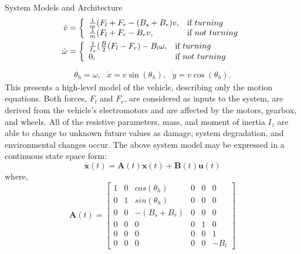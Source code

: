 \begin{section}{System Models and Architecture}
	\begin{equation}
    \begin{split}
    \label{eqn:plant}
    \dot{v}&=\left\{
    \begin{array}{ll}
    \frac{1}{m}(F_l+F_r-(B_s+B_r)v, & \hbox{if } turning\\
    \frac{1}{m}(F_l+F_r-B_rv, & \hbox{if } not~turning
    \end{array}
    \right.\\
    \dot{\omega}&=\left\{
    \begin{array}{ll}
    \frac{1}{I_z}(\frac{B}{2}(F_l-F_r)-B_l\omega, & \hbox{if } turning\\
    0, & \hbox{if } not~turning
    \end{array}
    \right.\\
    \end{split}
    \end{equation}
    \begin{align}
     \dot{\theta_h}=\omega,\text{ } \dot{x}=v\sin(\theta_h),\text{ } \dot{y}=v\cos(\theta_h).
	\end{align}
This presents a high-level model of the vehicle, describing only the motion equations. Both forces, $F_l$ and $F_r$, are considered as inputs to the system, are derived from the vehicle's electromotors and are affected by the motors, gearbox, and wheels. All of the resistive parameters, mass, and moment of inertia $I_z$ are able to change to unknown future values as damage, system degradation, and environmental changes occur. The above system model may be expressed in a continuous state space form:
    \begin{equation}
	\dot{\bm{x}}(t) = \bm{A}(t)\bm{x}(t) + \bm{B}(t)\bm{u}(t)
	\end{equation}
where,
    \begin{equation}
	\bm{A}(t)=\begin{bmatrix} 1 & 0 & cos(\theta_h) & 0 & 0 & 0 \\ 0 & 1 & sin(\theta_h) & 0 & 0 & 0 \\ 0 & 0 & -(B_s+B_r) & 0 & 0 & 0 \\ 0 & 0 & 0 & 0 & 1 & 0 \\ 0 & 0 & 0 & 0 & 0 & 1 \\  0 & 0 & 0 & 0 & 0 & -B_l \end{bmatrix} \nonumber
	\end{equation}
	\begin{equation}

\end{equation}
\end{section}
